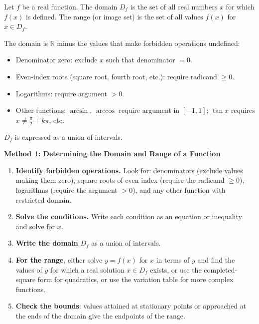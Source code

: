 \documentclass[11pt]{article}
\newcommand{\cle}[1]{{\popxbold\color{popdark}#1}}
\begin{document}
\begin{definition}
Let $f$ be a real function. The \cle{domain} $D_f$ is the set of all real numbers $x$ for which $f(x)$ is defined. The \cle{range} (or image set) is the set of all values $f(x)$ for $x\in D_f$.
\end{definition}

\begin{aretenir}
The domain is $\mathbb{R}$ minus the values that make forbidden operations undefined:
\begin{itemize}
\item Denominator zero: exclude $x$ such that denominator $=0$.
\item Even-index roots (square root, fourth root, etc.): require radicand $\geq 0$.
\item Logarithms: require argument $>0$.
\item Other functions: $\arcsin$, $\arccos$ require argument in $[-1,1]$; $\tan x$ requires $x\neq \frac{\pi}{2}+k\pi$, etc.
\end{itemize}
$D_f$ is expressed as a union of intervals.
\end{aretenir}

\textbf{Method 1: Determining the Domain and Range of a Function}\par

\begin{methode}
\begin{enumerate}
\item \textbf{Identify forbidden operations.} Look for: denominators (exclude values making them zero), square roots of even index (require the radicand $\geq 0$), logarithms (require the argument $>0$), and any other function with restricted domain.
\item \textbf{Solve the conditions.} Write each condition as an equation or inequality and solve for $x$.
\item \textbf{Write the domain} $D_f$ as a union of intervals.
\item \textbf{For the range}, either solve $y=f(x)$ for $x$ in terms of $y$ and find the values of $y$ for which a real solution $x\in D_f$ exists, or use the completed-square form for quadratics, or use the variation table for more complex functions.
\item \textbf{Check the bounds}: values attained at stationary points or approached at the ends of the domain give the endpoints of the range.
\end{enumerate}
\end{methode}
\end{document}
